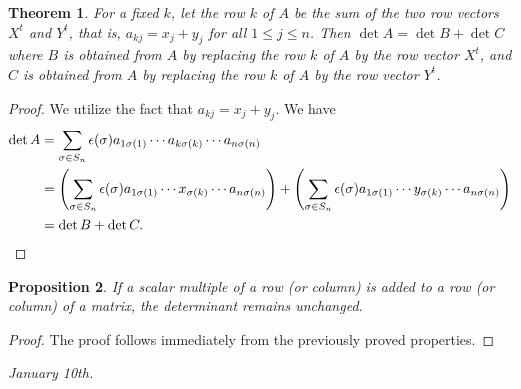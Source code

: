 \documentclass[15pt,a4paper]{book}
\newtheorem{theorem}{Theorem}[chapter]
\newtheorem{proposition}[theorem]{Proposition}
\theoremstyle{definition}
\begin{document}
\begin{theorem}
    For a fixed $k$, let the row $k$ of $A$ be the sum of the two row vectors $X^{t}$ and $Y^{t}$, that is, $a_{kj} = x_{j} + y_{j}$ for all $1 \leq j \leq n$. Then $\det{A} = \det{B} + \det{C}$ where $B$ is obtained from $A$ by replacing the row $k$ of $A$ by the row vector $X^{t}$, and $C$ is obtained from $A$ by replacing the row $k$ of $A$ by the row vector $Y^{t}$.
\end{theorem}
\begin{proof}
    We utilize the fact that $a_{kj} = x_{j} + y_{j}$. We have
    \begin{align}
        \det{A} &= \sum_{\sigma \in S_{n}} \epsilon(\sigma) a_{1 \sigma(1)} \cdots a_{k \sigma(k)} \cdots a_{n \sigma(n)} \notag \\
        &= \left( \sum_{\sigma \in S_{n}} \epsilon(\sigma) a_{1 \sigma(1)} \cdots x_{\sigma(k)} \cdots a_{n \sigma(n)} \right) + \left( \sum_{\sigma \in S_{n}} \epsilon(\sigma) a_{1 \sigma(1)} \cdots y_{\sigma(k)} \cdots a_{n \sigma(n)} \right) \notag \\
        &= \det{B} + \det{C}. \notag
    \end{align}
\end{proof}

\begin{proposition}
    If a scalar multiple of a row (or column) is added to a row (or column) of a matrix, the determinant remains unchanged.
\end{proposition}
\begin{proof}
    The proof follows immediately from the previously proved properties.
\end{proof}
\textit{January 10th.}
\end{document}
